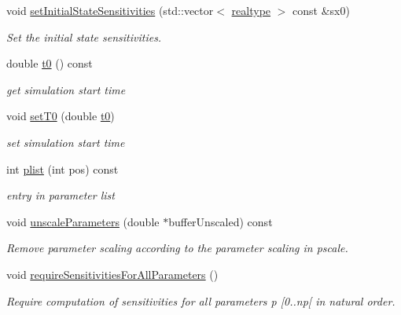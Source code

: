 \begin{DoxyCompactItemize}
void \mbox{\hyperlink{classamici_1_1_model_a82941b121d9db31d357642092a2cd41d}{set\+Initial\+State\+Sensitivities}} (std\+::vector$<$ \mbox{\hyperlink{namespaceamici_a1bdce28051d6a53868f7ccbf5f2c14a3}{realtype}} $>$ const \&sx0)
\begin{DoxyCompactList}\small\item\em Set the initial state sensitivities. \end{DoxyCompactList}\item 
double \mbox{\hyperlink{classamici_1_1_model_a223e567004c82b5facc2fe98cdd16855}{t0}} () const
\begin{DoxyCompactList}\small\item\em get simulation start time \end{DoxyCompactList}\item 
void \mbox{\hyperlink{classamici_1_1_model_aaf5053fde7e205c89d89c000a7693987}{set\+T0}} (double \mbox{\hyperlink{classamici_1_1_model_a223e567004c82b5facc2fe98cdd16855}{t0}})
\begin{DoxyCompactList}\small\item\em set simulation start time \end{DoxyCompactList}\item 
int \mbox{\hyperlink{classamici_1_1_model_a6ac0de1b7dfddbb4a480657f62573563}{plist}} (int pos) const
\begin{DoxyCompactList}\small\item\em entry in parameter list \end{DoxyCompactList}\item 
void \mbox{\hyperlink{classamici_1_1_model_aa47922509b4e6ae5ff93e625f64b9785}{unscale\+Parameters}} (double $\ast$buffer\+Unscaled) const
\begin{DoxyCompactList}\small\item\em Remove parameter scaling according to the parameter scaling in pscale. \end{DoxyCompactList}\item 
\mbox{\label{classamici_1_1_model_a9b03cc8dbac85d38ced3f59234ba27d9}} 
void \mbox{\hyperlink{classamici_1_1_model_a9b03cc8dbac85d38ced3f59234ba27d9}{require\+Sensitivities\+For\+All\+Parameters}} ()
\begin{DoxyCompactList}\small\item\em Require computation of sensitivities for all parameters p \mbox{[}0..np\mbox{[} in natural order. \end{DoxyCompactList}\item 

\end{DoxyCompactItemize}
